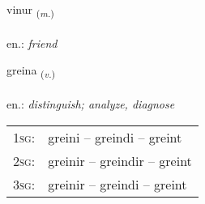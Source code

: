 \documentclass[frontgrid, backgrid]{flacards}\usepackage[]{graphicx}\usepackage[]{xcolor}
\begin{document}
\renewcommand{\blhead}{\vskip5pt {\small\bfseries\footnotesize Nafnorð | Noun }}
\renewcommand{\bcfoot}{\vskip5pt \hspace{2pt}{\small\bfseries\footnotesize 1K}}


{vinur \small{\textsubscript{(\textit{m.})}} \\[1ex] %
\textphonetic{[vɪːnʏr]} \\
en.: \emph{friend} \\  [2ex]
\renewcommand*{\arraystretch}{0.8}
}

\renewcommand{\flhead}{\vskip5pt \fboxsep=0pt {\small\bfseries\footnotesize Sagnorð | Verb}}
\renewcommand{\fcfoot}{\vskip5pt \fboxsep=0pt \hspace{2pt}{\small\bfseries\footnotesize 1K}}

\renewcommand{\blhead}{\vskip5pt {\small\bfseries\footnotesize Sagnorð | Verb }}
\renewcommand{\bcfoot}{\vskip5pt \hspace{2pt}{\small\bfseries\footnotesize 1K}}


{greina \small{\textsubscript{(\textit{v.})}} \\[1ex] %
\textphonetic{[kreiːna]} \\
en.: \emph{distinguish; analyze, diagnose} \\  [2ex]
\renewcommand*{\arraystretch}{0.8}
\begin{tabular}{p{1cm}l}
\textsc{1sg}: & greini -- greindi -- greint \\ 
\textsc{2sg}: & greinir -- greindir -- greint \\ 
\textsc{3sg}: & greinir -- greindi -- greint \\ 
\end{tabular}
}

\renewcommand{\flhead}{\vskip5pt \fboxsep=0pt {\small\bfseries\footnotesize Sagnorð | Verb}}
\renewcommand{\fcfoot}{\vskip5pt \fboxsep=0pt \hspace{2pt}{\small\bfseries\footnotesize 1K}}
\end{document}
